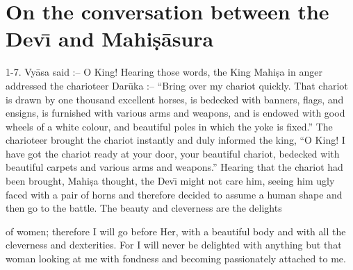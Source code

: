 \chapter{On the conversation between the Dev\={\i} and Mahi\d{s}\=asura}

1-7. Vy\=asa said :-- O King! Hearing those words, the King Mahi\d{s}a in anger addressed the charioteer Dar\=uka :-- ``Bring over my chariot quickly. That chariot is drawn by one thousand excellent horses, is bedecked with banners, flags, and ensigns, is furnished with various arms and weapons, and is endowed with good wheels of a white colour, and beautiful poles in which the yoke is fixed.'' The charioteer brought the chariot instantly and duly informed the king, ``O King! I have got the chariot ready at your door, your beautiful chariot, bedecked with beautiful carpets and various arms and weapons.'' Hearing that the chariot had been brought, Mahi\d{s}a thought, the Dev\={\i} might not care him, seeing him ugly faced with a pair of horns and therefore decided to assume a human shape and then go to the battle. The beauty and cleverness are the delights

of women; therefore I will go before Her, with a beautiful body and with all the cleverness and dexterities. For I will never be delighted with anything but that woman looking at me with fondness and becoming passionately attached to me.


